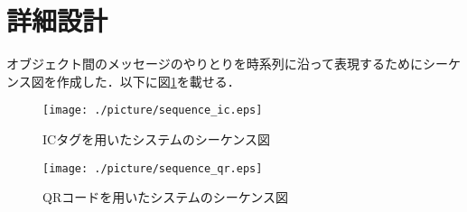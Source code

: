 

\section{詳細設計}

オブジェクト間のメッセージのやりとりを時系列に沿って表現するためにシーケンス図を作成した．以下に図\ref{sequence_ic}を載せる．

\begin{figure}[htbp]
\centering
\texttt{[image: ./picture/sequence\_ic.eps]}
\caption{ICタグを用いたシステムのシーケンス図}
\label{sequence_ic}
\end{figure}

\begin{figure}[htbp]
\centering
\texttt{[image: ./picture/sequence\_qr.eps]}
\caption{QRコードを用いたシステムのシーケンス図}
\label{sequence_qr}
\end{figure}